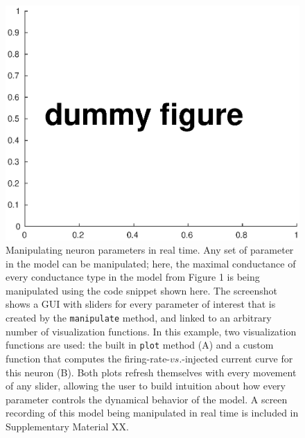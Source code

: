 \documentclass{frontiersSCNS} %
\begin{document}
\begin{figure}
	\centering
	\includegraphics[width=1.0\linewidth]{gfx/figure_manipulate}
	\caption{Manipulating neuron parameters in real time. Any set of parameter in the model can be manipulated; here, the maximal conductance of every conductance type in the model from Figure 1 is being manipulated using the code snippet shown here. The screenshot shows a GUI with sliders for every parameter of interest that is created by the \texttt{manipulate} method, and linked to an arbitrary number of visualization functions. In this example, two visualization functions are used: the built in \texttt{plot} method (A) and a custom function that computes the firing-rate-$vs$.-injected current curve for this neuron (B). Both plots refresh themselves with every movement of any slider, allowing the user to build intuition about how every parameter controls the dynamical behavior of the model. A screen recording of this model being manipulated in real time is included in Supplementary Material XX. }
	\label{fig:figuremanipulate}
\end{figure}

\clearpage
\end{document}
